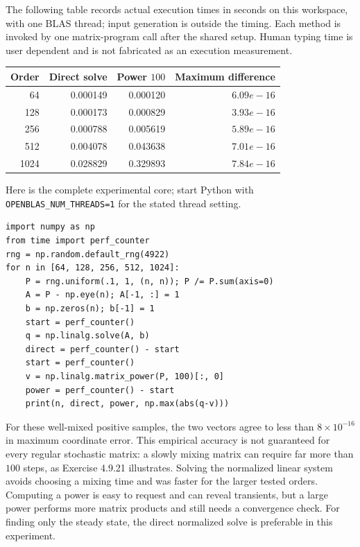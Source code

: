 The following table records actual execution times in seconds on this
workspace, with one BLAS thread; input generation is outside the timing.
Each method is invoked by one matrix-program call after the shared setup.
Human typing time is user dependent and is not fabricated as an execution measurement.
\begin{center}\begin{tabular}{rrrr}\toprule
Order&Direct solve&Power $100$&Maximum difference\\\midrule
64&0.000149&0.000120&$6.09e-16$\\
128&0.000173&0.000829&$3.93e-16$\\
256&0.000788&0.005619&$5.89e-16$\\
512&0.004078&0.043638&$7.01e-16$\\
1024&0.028829&0.329893&$7.84e-16$\\
\bottomrule\end{tabular}\end{center}
Here is the complete experimental core; start Python with
\texttt{OPENBLAS\_NUM\_THREADS=1} for the stated thread setting.
\begin{verbatim}
import numpy as np
from time import perf_counter
rng = np.random.default_rng(4922)
for n in [64, 128, 256, 512, 1024]:
    P = rng.uniform(.1, 1, (n, n)); P /= P.sum(axis=0)
    A = P - np.eye(n); A[-1, :] = 1
    b = np.zeros(n); b[-1] = 1
    start = perf_counter()
    q = np.linalg.solve(A, b)
    direct = perf_counter() - start
    start = perf_counter()
    v = np.linalg.matrix_power(P, 100)[:, 0]
    power = perf_counter() - start
    print(n, direct, power, np.max(abs(q-v)))
\end{verbatim}
For these well-mixed positive samples, the two vectors agree to less than
$8\times10^{-16}$ in maximum coordinate error. This empirical accuracy
is not guaranteed for every regular stochastic matrix: a slowly mixing
matrix can require far more than $100$ steps, as Exercise 4.9.21 illustrates.
Solving the normalized linear system avoids choosing a mixing time and was
faster for the larger tested orders. Computing a power is easy to request
and can reveal transients, but a large power performs more matrix products
and still needs a convergence check. For finding only the steady state,
the direct normalized solve is preferable in this experiment.
